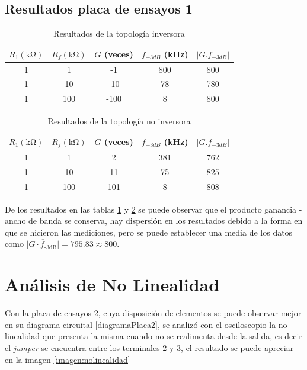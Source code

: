 \documentclass[letterpaper, 10 pt, conference]{ieeeconf}  %
\begin{document}
\subsection{Resultados placa de ensayos 1}
\begin{table}[H]
\centering
\caption{Resultados de la topología inversora}
\label{tab:resultadosInversora}
\begin{tabular}{|c|c|c|c|c|}
\hline
$R_{1} (\unit{\kilo\ohm})$ & $R_{f} (\unit{\kilo\ohm})$ & $G$ (veces) & $f_{-3dB}$ (\unit{\kilo\hertz}) & $|G.f_{-3dB}|$ \\
\hline
1 & 1 & -1 & 800 & 800 \\
1 & 10 & -10 & 78 & 780 \\
1 & 100 & -100 & 8 & 800 \\
\hline
\end{tabular}
\end{table}
\begin{table}[H]
\centering
\caption{Resultados de la topología no inversora}
\label{tab:resultadosNoInversora}
\begin{tabular}{|c|c|c|c|c|}
\hline
$R_{1} (\unit{\kilo\ohm})$ & $R_{f} (\unit{\kilo\ohm})$ & $G$ (veces) & $f_{-3dB}$ (\unit{\kilo\hertz}) & $|G.f_{-3dB}|$ \\
\hline
1 & 1 & 2 & 381 & 762 \\
1 & 10 & 11 & 75 & 825 \\
1 & 100 & 101 & 8 & 808 \\
\hline
\end{tabular}
\end{table}

De los resultados en las tablas \ref{tab:resultadosInversora} y \ref{tab:resultadosNoInversora} se puede observar que el producto ganancia - ancho de banda se conserva, hay dispersión en los resultados debido a la forma en que se hicieron las mediciones, pero se puede establecer una media de los datos como $\overline{|G \cdot f_{\text{-3dB}}|} = 795.83 \approx 800 $.

\section{Análisis de No Linealidad}
Con la placa de ensayos 2, cuya disposición de elementos se puede observar mejor en su diagrama circuital \ref{diagramaPlaca2}, se analizó con el osciloscopio la no linealidad que presenta la misma cuando no se realimenta desde la salida, es decir el \textit{jumper} se encuentra entre los terminales 2 y 3, el resultado se puede apreciar en la imagen \ref{imagen:nolinealidad}
\end{document}
